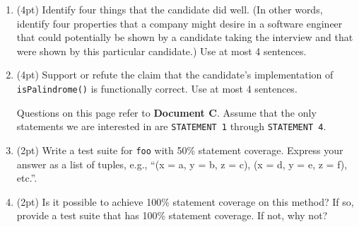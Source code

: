 \documentclass{report}
\newif\ifkey
\newcommand{\answerlong}[1]{\ifkey\color{red}\textbf{#1}\color{black}\else\vspace{0.5in}\fi\xspace}
\newcommand*{\pts}[1]{\addtocounter{points}{#1}(#1pt)}
\begin{document}
\begin{spacing}{1.4}
\begin{enumerate}[leftmargin=*]
  \item \pts{4}  Identify four things that the candidate did well. (In other words, identify four properties that a company might
desire in a software engineer that could potentially be shown by a candidate taking the interview and that were shown by this
particular candidate.) Use at most 4 sentences.\\
\answerlong{Answers will vary. Potential solutions include the following:
1. The candidate provided inline comments explaining some of their code.
2. The candidate asked relevant questions regarding code functionality.
3. The candidate has consistent indentation.
4. The candidate used a descriptive variable name.}

\item \pts{4} Support or refute the claim that the candidate's implementation of \lstinline{isPalindrome()} is functionally correct. Use
  at most 4 sentences.\\
  \answerlong{Refute. The candidate's implementation of isPalindrome() is not functionally correct. The candidate missed a base
case regarding x being a negative number. Negative integers would not count as a palindrome. {-313} reversed is {313-}.}
    
    \newpage

    Questions on this page refer to \textbf{Document C}.
    Assume that the only statements we are interested in are \lstinline{STATEMENT 1} through \lstinline{STATEMENT 4}.

  \item \label{sl1} \pts{2} Write a test suite for \lstinline{foo} with 50\% statement coverage. Express your answer as a list of tuples, e.g., ``(x = a, y = b, z = c), (x = d, y = e, z = f), etc.''. \\
  \answerlong{(x = 6, y = 0, z = 3)}
    
  \item \pts{2} Is it possible to achieve 100\% statement coverage on this method? If so, provide a test suite that has 100\% statement coverage. If not, why not? \\
    \answerlong{It is not possible, because STATEMENT 2 is unreachable.}


\end{enumerate}
\end{spacing}
\end{document}
